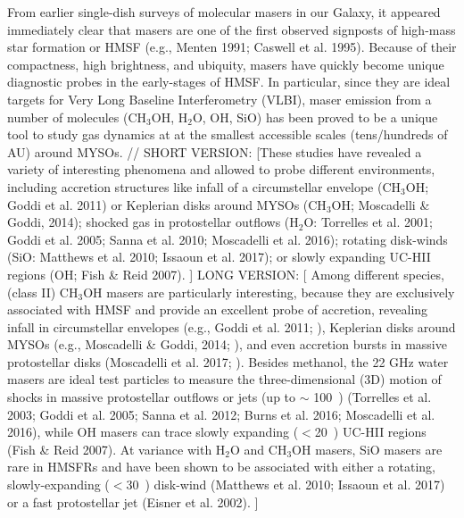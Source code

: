 \documentclass[twocolumn]{aastex62}
\begin{document}
{\color{blue} 
From earlier single-dish surveys of molecular masers in
our Galaxy, it appeared immediately clear that masers are
one of the first observed signposts of high-mass star formation or HMSF (e.g., Menten
1991; Caswell et al. 1995).
Because of their compactness, high brightness, and ubiquity,
masers have quickly become unique diagnostic probes in the early-stages of HMSF. 
In particular, since they are ideal targets for Very Long Baseline Interferometry (VLBI), 
maser emission from a number of molecules (CH$_3$OH, H$_2$O, OH, SiO) 
has been proved to be a unique tool to study
gas dynamics at at the smallest accessible scales  (tens/hundreds of AU) around
MYSOs. //
 SHORT VERSION:
[These studies have revealed a variety of interesting phenomena and allowed to probe different environments, including accretion structures like infall of a circumstellar envelope (CH$_3$OH; Goddi et al. 2011) or Keplerian disks around MYSOs (CH$_3$OH;  Moscadelli \& Goddi, 2014); shocked gas in protostellar outflows  (H$_2$O:  Torrelles et al. 2001; Goddi et al. 2005; Sanna et al. 2010; Moscadelli et al. 2016);  rotating disk-winds (SiO: Matthews et al. 2010; Issaoun et al. 2017); or slowly expanding UC-HII regions (OH; Fish \& Reid 2007). ]
 LONG VERSION:
[ Among different species, (class II) CH$_3$OH masers are particularly interesting, because they are exclusively associated with HMSF and provide an excellent probe of accretion, revealing infall in  circumstellar envelopes (e.g., Goddi et al. 2011; ), Keplerian disks around MYSOs (e.g., Moscadelli \& Goddi, 2014; ), and even accretion bursts in massive protostellar disks  (Moscadelli et al. 2017; ).
Besides methanol, the 22 GHz water masers are ideal test particles to measure the three-dimensional
(3D) motion of shocks  in massive protostellar outflows or jets (up to $\sim$ 100~\kms)  (Torrelles et al. 2003; Goddi et al. 2005; Sanna et al. 2012; Burns et al. 2016; Moscadelli et al. 2016), while OH masers can trace slowly expanding ($<$20~\kms) UC-HII regions (Fish \& Reid 2007).
At variance with H$_2$O and CH$_3$OH masers, SiO masers are rare in HMSFRs and have been shown to be associated with either a rotating, slowly-expanding ($<$30~\kms) disk-wind (Matthews et al. 2010; Issaoun et al. 2017) or a fast protostellar jet (Eisner et al. 2002). ]



}
\end{document}
